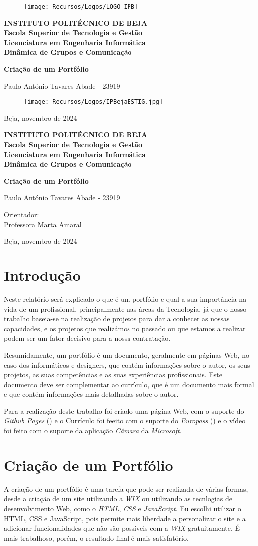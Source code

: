 \documentclass[a4paper]{article}
\newcommand{\firsttitlepage}{
    \begin{titlepage}
        \centering
        \vspace*{1cm}
        
        \begin{figure}[h!]
            \centering
            \texttt{[image: Recursos/Logos/LOGO\_IPB]} %
            \vspace{0.5cm}
        \end{figure}

        \large\textbf{INSTITUTO POLITÉCNICO DE BEJA} \\
        \large\textbf{Escola Superior de Tecnologia e Gestão} \\
        \large\textbf{Licenciatura em Engenharia Informática} \\
        \large\textbf{Dinâmica de Grupos e Comunicação} \\
        
        \vspace{2cm}
        
        {\Huge \textbf{Criação de um Portfólio}} \\
        
        \vspace{1.5cm}
        
        \large Paulo António Tavares Abade - 23919 \\
        
        \vfill
        
        \begin{figure}[h!]
            \centering
            \texttt{[image: Recursos/Logos/IPBejaESTIG.jpg]} %
        \end{figure}
        
        \vspace{1cm}
        
        {\large Beja, novembro de 2024}
    \end{titlepage}
}
\newcommand{\secondtitlepage}{
    \begin{titlepage}
        \centering
        \vspace*{1cm}
        
        \large\textbf{INSTITUTO POLITÉCNICO DE BEJA} \\
        \large\textbf{Escola Superior de Tecnologia e Gestão} \\
        \large\textbf{Licenciatura em Engenharia Informática} \\
        \large\textbf{Dinâmica de Grupos e Comunicação} \\
        
        \vspace{2cm}
        
        {\Huge \textbf{Criação de um Portfólio}} \\
        
        \vspace{1.5cm}
        
        \large Paulo António Tavares Abade - 23919 \\

        \vspace{2cm}

        \large Orientador:\\ Professora Marta Amaral
        
        \vfill
        
        {\large Beja, novembro de 2024}
    \end{titlepage}
}
\begin{document}


\firsttitlepage


\secondtitlepage


\newpage

\renewcommand{\contentsname}{Indíce}
\renewcommand{\refname}{Bibliografia}
\renewcommand{\thefigure}{\thesection.\arabic{figure}}

\newpage
{}
\doublespacing
\tableofcontents
\doublespacing

\newpage
{}

\section{Introdução}\label{intro}
Neste relatório será explicado o que é um portfólio e qual a sua importância na vida de um profissional, principalmente nas 
áreas da Tecnologia, já que o nosso trabalho baseia-se na realização de projetos para dar a conhecer as nossas capacidades, 
e os projetos que realizámos no passado ou que estamos a realizar podem ser um fator decisivo para a nossa contratação.

Resumidamente, um portfólio é um documento, geralmente em páginas Web, no caso dos informáticos e designers, que contém
informações sobre o autor, os seus projetos, as suas competências e as suas experiências profissionais. Este documento deve ser 
complementar ao currículo, que é um documento mais formal e que contém informações mais detalhadas sobre o autor.


Para a realização deste trabalho foi criado uma página Web, com o suporte do \textit{Github Pages} (\cite{gitpages})
e o Currículo foi feeito com o suporte do \textit{Europass} (\cite{europass}) e o vídeo foi feito com o suporte da aplicação \textit{Câmara} 
da \textit{Microsoft}.

\newpage
\section{Criação de um Portfólio}\label{criacao}
A criação de um portfólio é uma tarefa que pode ser realizada de várias formas, desde a criação 
de um site utilizando a \textit{WIX} ou utilizando as tecnlogias de desenvolvimento Web, 
como o \textit{HTML}, \textit{CSS} e \textit{JavaScript}. Eu escolhi utilizar o HTML, CSS e JavaScript, 
pois permite mais liberdade a personalizar o site e a adicionar funcionalidades que não são possíveis
com a \textit{WIX} gratuitamente. É mais trabalhoso, porém, o resultado final é mais satisfatório.
\end{document}
